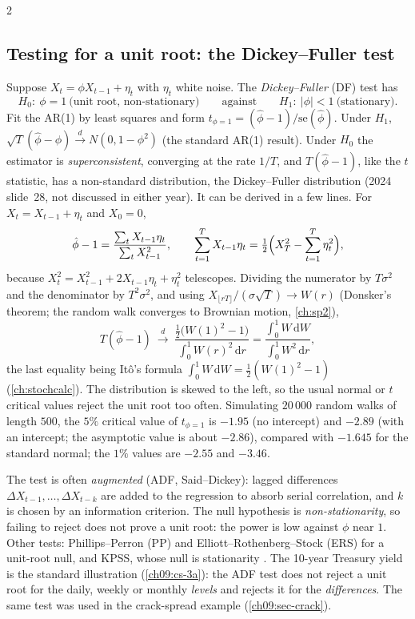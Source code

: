 \begin{paracol}{2}
\subsection{Testing for a unit root: the Dickey--Fuller test}\label{ch09:sec-df}
Suppose $X_t=\phi X_{t-1}+\eta_t$ with $\eta_t$ white noise. The \emph{Dickey--Fuller} (DF) test has
\[
  H_0:\ \phi=1\ \text{(unit root, non-stationary)}\qquad\text{against}\qquad H_1:\ |\phi|<1\ \text{(stationary)} .
\]
Fit the AR(1) by least squares and form $t_{\phi=1}=(\hat\phi-1)/\mathrm{se}(\hat\phi)$. Under $H_1$,
$\sqrt T(\hat\phi-\phi)\xrightarrow{d}N(0,1-\phi^2)$ (the standard AR(1) result). Under $H_0$ the estimator is
\emph{superconsistent}, converging at the rate $1/T$, and $T(\hat\phi-1)$, like the $t$ statistic, has a non-standard
distribution, the Dickey--Fuller distribution (2024 slide~28, not discussed in either year). It can be derived in a few lines. For
$X_t=X_{t-1}+\eta_t$ and $X_0=0$,
\[
  \hat\phi-1=\frac{\sum_tX_{t-1}\eta_t}{\sum_tX_{t-1}^2},\qquad
  \sum_{t=1}^TX_{t-1}\eta_t=\tfrac12\Bigl(X_T^2-\sum_{t=1}^T\eta_t^2\Bigr),
\]
because $X_t^2=X_{t-1}^2+2X_{t-1}\eta_t+\eta_t^2$ telescopes. Dividing the numerator by $T\sigma^2$ and the
denominator by $T^2\sigma^2$, and using $X_{\lfloor rT\rfloor}/(\sigma\sqrt T)\to W(r)$ (Donsker's theorem; the
random walk converges to Brownian motion, \cref{ch:sp2}),
\begin{equation}\label{ch09:eq-df}
  T(\hat\phi-1)\ \xrightarrow{d}\ \frac{\tfrac12\bigl(W(1)^2-1\bigr)}{\int_0^1W(r)^2\,\mathrm dr}
  =\frac{\int_0^1W\,\mathrm dW}{\int_0^1W^2\,\mathrm dr},
\end{equation}
the last equality being Itô's formula $\int_0^1W\,\mathrm dW=\tfrac12(W(1)^2-1)$ (\cref{ch:stochcalc}). The distribution is skewed to the
left, so the usual normal or $t$ critical values reject the unit root too often. Simulating $20\,000$ random walks of length $500$,
the $5\%$ critical value of $t_{\phi=1}$ is $-1.95$ (no intercept) and $-2.89$ (with an intercept; the asymptotic value is
about $-2.86$), compared with $-1.645$ for the standard normal; the $1\%$ values are $-2.55$ and $-3.46$.

The test is often \emph{augmented} (ADF, Said--Dickey): lagged differences $\Delta X_{t-1},\dots,\Delta X_{t-k}$ are added to the
regression to absorb serial correlation, and $k$ is chosen by an information criterion. The null hypothesis is
\emph{non-stationarity}, so failing to reject does not prove a unit root: the power is low against $\phi$ near $1$. Other tests:
Phillips--Perron (PP) and Elliott--Rothenberg--Stock (ERS) for a unit-root null, and KPSS, whose null is stationarity
. The 10-year Treasury yield is the standard illustration (\cref{ch09:cs-3a}): the ADF test does not reject a
unit root for the daily, weekly or monthly \emph{levels} and rejects it for the \emph{differences}. The same test was used in the crack-spread example
(\cref{ch09:sec-crack}).


\end{paracol}
